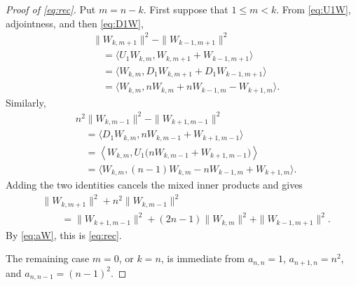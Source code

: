 \documentclass[a4paper,draft]{amsart}
\begin{document}
\begin{proof}[Proof of \eqref{eq:rec}]
Put $m=n-k$.  First suppose that $1\leq m<k$.  From
\eqref{eq:U1W}, adjointness, and then \eqref{eq:D1W},
\begin{align*}
&\|W_{k,m+1}\|^2-\|W_{k-1,m+1}\|^2\\
&\quad=\langle U_1W_{k,m},
       W_{k,m+1}+W_{k-1,m+1}\rangle\\
&\quad=\langle W_{k,m},
       D_1W_{k,m+1}+D_1W_{k-1,m+1}\rangle\\
&\quad=\big\langle W_{k,m},
       nW_{k,m}+nW_{k-1,m}-W_{k+1,m}\big\rangle.
\end{align*}
Similarly,
\begin{align*}
&n^2\|W_{k,m-1}\|^2-\|W_{k+1,m-1}\|^2\\
&\quad=\langle D_1W_{k,m},
       nW_{k,m-1}+W_{k+1,m-1}\rangle\\
&\quad=\left\langle W_{k,m},
       U_1\bigl(nW_{k,m-1}+W_{k+1,m-1}\bigr)\right\rangle\\
&\quad=\big\langle W_{k,m},
       (n-1)W_{k,m}-nW_{k-1,m}+W_{k+1,m}\big\rangle.
\end{align*}
Adding the two identities cancels the mixed inner products and gives
\begin{align*}
&\|W_{k,m+1}\|^2+n^2\|W_{k,m-1}\|^2\\
&\qquad=\|W_{k+1,m-1}\|^2+(2n-1)\|W_{k,m}\|^2
       +\|W_{k-1,m+1}\|^2.
\end{align*}
By \eqref{eq:aW}, this is \eqref{eq:rec}.

The remaining case $m=0$, or $k=n$, is immediate from
$a_{n,n}=1$, $a_{n+1,n}=n^2$, and $a_{n,n-1}=(n-1)^2$.
\end{proof}
\end{document}
